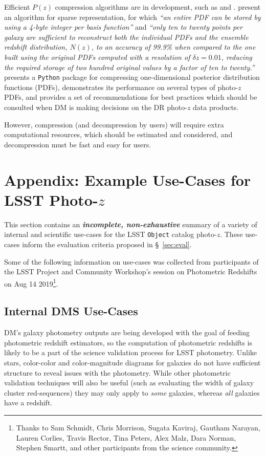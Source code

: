 \documentclass[DM,authoryear,toc]{lsstdoc}
\begin{document}
Efficient $P(z)$ compression algorithms are in development, such as \citet{2014MNRAS.441.3550C} and \citet{2018AJ....156...35M}.
\citet{2014MNRAS.441.3550C} present an algorithm for sparse representation, for which {\it ``an entire PDF can be stored by using a 4-byte integer per basis function''} and {\it ``only ten to twenty points per galaxy are sufficient to reconstruct both the individual PDFs and the ensemble redshift distribution, $N(z)$, to an accuracy of 99.9\% when compared to the one built using the original PDFs computed with a resolution of $\delta z = 0.01$, reducing the required storage of two hundred original values by a factor of ten to twenty.''} 
\citet{2018AJ....156...35M} presents a {\tt Python} package for compressing one-dimensional posterior distribution functions (PDFs), demonstrates its performance on several types of photo-$z$ PDFs, and provides a set of recommendations for best practices which should be consulted when DM is making decisions on the DR photo-$z$ data products.

However, compression (and decompression by users) will require extra computational resources, which should be estimated and considered, and decompression must be fast and easy for users.

\section{Appendix: Example Use-Cases for LSST Photo-$z$} \label{sec:use}

This section contains an \textbf{\textit{incomplete, non-exhaustive}} summary of a variety of internal and scientific use-cases for the LSST {\tt Object} catalog photo-$z$.
These use-cases inform the evaluation criteria proposed in \S~\ref{sec:eval}. 

Some of the following information on use-cases was collected from participants of the LSST Project and Community Workshop's session on Photometric Redshifts on Aug 14 2019\footnote{Thanks to Sam Schmidt, Chris Morrison, Sugata Kaviraj, Gautham Narayan, Lauren Corlies, Travis Rector, Tina Peters, Alex Malz, Dara Norman, Stephen Smartt, and other participants from the science community.}.

\subsection{Internal DMS Use-Cases}\label{ssec:use_dm}

DM's galaxy photometry outputs are being developed with the goal of feeding photometric redshift estimators, so the computation of photometric redshifts is likely to be a part of the science validation process for LSST photometry. 
Unlike stars, color-color and color-magnitude diagrams for galaxies do not have sufficient structure to reveal issues with the photometry.
While other photometric validation techniques will also be useful (such as evaluating the width of galaxy cluster red-sequences) they may only apply to {\it some} galaxies, whereas {\it all} galaxies have a redshift. 
\end{document}
